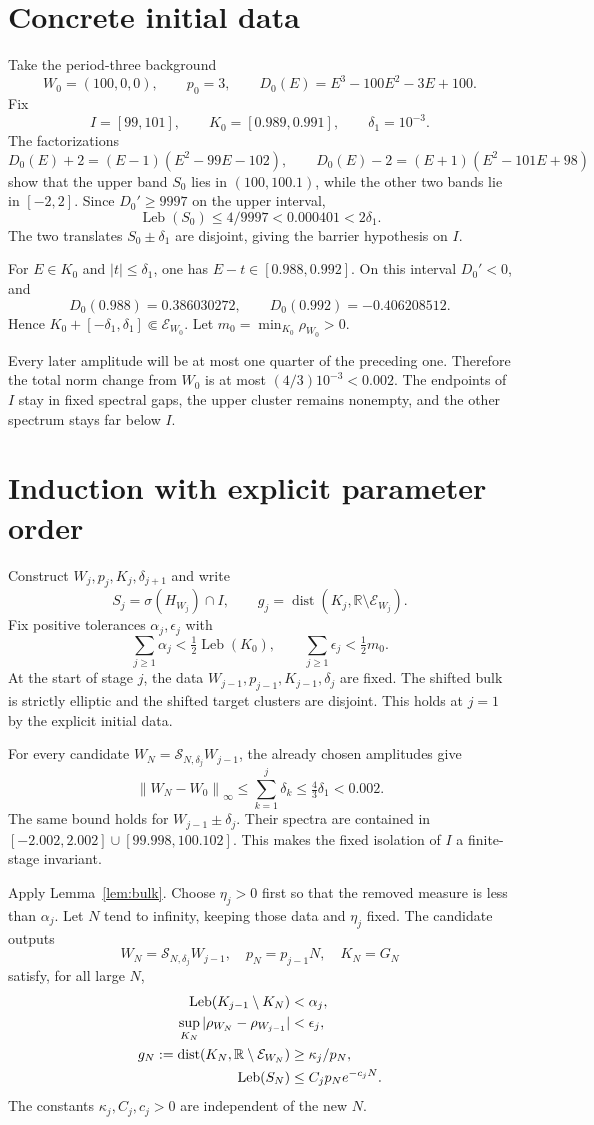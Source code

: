 \documentclass[11pt,a4paper]{article}
\numberwithin{equation}{section}
\theoremstyle{remark}
\newcommand{\R}{\mathbb R}
\newcommand{\dist}{\operatorname{dist}}
\newcommand{\spec}{\sigma}
\newcommand{\Leb}{\operatorname{Leb}}
\newcommand{\norm}[1]{\left\lVert #1\right\rVert}
\begin{document}
\section{Concrete initial data}
Take the period-three background
\[
W_0=(100,0,0),\qquad p_0=3,\qquad
D_0(E)=E^3-100E^2-3E+100.
\]
Fix
\[
I=[99,101],\qquad K_0=[0.989,0.991],\qquad
\delta_1=10^{-3}.
\]
The factorizations
\[
D_0(E)+2=(E-1)(E^2-99E-102),\qquad
D_0(E)-2=(E+1)(E^2-101E+98)
\]
show that the upper band $S_0$ lies in $(100,100.1)$,
while the other two bands lie in $[-2,2]$.
Since $D_0'\ge9997$ on the upper interval,
\[
\Leb(S_0)\le4/9997<0.000401<2\delta_1.
\]
The two translates $S_0\pm\delta_1$ are disjoint, giving
the barrier hypothesis on $I$.

For $E\in K_0$ and $|t|\le\delta_1$, one has
$E-t\in[0.988,0.992]$. On this interval $D_0'<0$, and
\[
D_0(0.988)=0.386030272,\qquad
D_0(0.992)=-0.406208512.
\]
Hence $K_0+[-\delta_1,\delta_1]\Subset\mathcal E_{W_0}$.
Let $m_0=\min_{K_0}\rho_{W_0}>0$.

Every later amplitude will be at most one quarter of
the preceding one. Therefore the total norm change from
$W_0$ is at most $(4/3)10^{-3}<0.002$.
The endpoints of $I$ stay in fixed spectral gaps,
the upper cluster remains nonempty, and the other
spectrum stays far below $I$.

\section{Induction with explicit parameter order}
Construct $W_j,p_j,K_j,\delta_{j+1}$ and write
\[
S_j=\spec(H_{W_j})\cap I,\qquad
g_j=\dist(K_j,\R\setminus\mathcal E_{W_j}).
\]
Fix positive tolerances $\alpha_j,\epsilon_j$ with
\[
\sum_{j\ge1}\alpha_j<\tfrac12\Leb(K_0),\qquad
\sum_{j\ge1}\epsilon_j<\tfrac12m_0.
\]
At the start of stage $j$, the data
$W_{j-1},p_{j-1},K_{j-1},\delta_j$ are fixed.
The shifted bulk is strictly elliptic and the shifted
target clusters are disjoint. This holds at $j=1$ by
the explicit initial data.

For every candidate $W_N=\mathcal S_{N,\delta_j}W_{j-1}$,
the already chosen amplitudes give
\[
\norm{W_N-W_0}_\infty\le\sum_{k=1}^j\delta_k
\le\tfrac43\delta_1<0.002.
\]
The same bound holds for $W_{j-1}\pm\delta_j$.
Their spectra are contained in
$[-2.002,2.002]\cup[99.998,100.102]$.
This makes the fixed isolation of $I$ a finite-stage invariant.

Apply Lemma~\ref{lem:bulk}. Choose $\eta_j>0$ first so
that the removed measure is less than $\alpha_j$.
Let $N$ tend to infinity, keeping those data and
$\eta_j$ fixed. The candidate outputs
\[
W_N=\mathcal S_{N,\delta_j}W_{j-1},\quad
p_N=p_{j-1}N,\quad K_N=G_N
\]
satisfy, for all large $N$,
\begin{align}
\Leb(K_{j-1}\setminus K_N)&<\alpha_j,\notag\\
\sup_{K_N}|\rho_{W_N}-\rho_{W_{j-1}}|&<\epsilon_j,\notag\\
g_N:=\dist(K_N,\R\setminus\mathcal E_{W_N})
&\ge\kappa_j/p_N,\label{eq:gN}\\
\Leb(S_N)&\le C_jp_Ne^{-c_jN}.\label{eq:sN}
\end{align}
The constants $\kappa_j,C_j,c_j>0$ are independent of
the new $N$.
\end{document}
